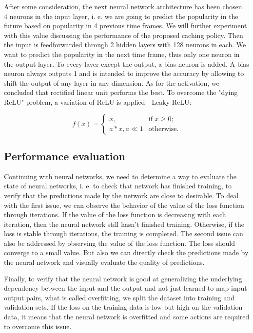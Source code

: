 After some consideration, the next neural network architecture has been chosen. 4 neurons in the input layer, i. e. we are going to predict the popularity in the future based on popularity in 4 previous time frames. We will further experiment with this value discussing the performance of the proposed caching policy. Then the input is feedforwarded through 2 hidden layers with 128 neurons in each. We want to predict the popularity in the next time frame, thus only one neuron in the output layer. To every layer except the output, a bias neuron is added. A bias neuron always outputs 1 and is intended to improve the accuracy by allowing to shift the output of any layer in any dimension. As for the activation, we concluded that rectified linear unit performs the best. To overcome the "dying ReLU"\cite{14} problem, a variation of ReLU is applied - Leaky ReLU:

$$ f(x) = 
	\begin{cases}
	x, & \text{if } x \geq 0; \\
	a*x, a \ll 1 & \text{otherwise.}
	\end{cases}
$$

\subsection{Performance evaluation} \label{performance_eval}

Continuing with neural networks, we need to determine a way to evaluate the state of neural networks, i. e. to check that network has finished training, to verify that the predictions made by the network are close to desirable. To deal with the first issue, we can observe the behavior of the value of the loss function through iterations. If the value of the loss function is decreasing with each iteration, then the neural network still hasn't finished training. Otherwise, if the loss is stable through iterations, the training is completed. The second issue can also be addressed by observing the value of the loss function. The loss should converge to a small value. But also we can directly check the predictions made by the neural network and visually evaluate the quality of predictions.

Finally, to verify that the neural network is good at generalizing the underlying dependency between the input and the output and not just learned to map input-output pairs, what is called overfitting\cite{15}, we split the dataset into training and validation sets. If the loss on the training data is low but high on the validation data, it means that the neural network is overfitted and some actions are required to overcome this issue.

